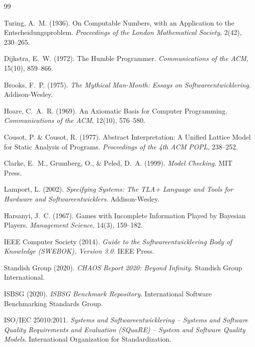 ﻿\documentclass[a4paper,12pt]{article}
\theoremstyle{definition}
\begin{document}
\begin{thebibliography}{99}

    Turing, A.~M. (1936).
    On Computable Numbers, with an Application to the Entscheidungsproblem.
    \textit{Proceedings of the London Mathematical Society}, 2(42), 230--265.

    Dijkstra, E.~W. (1972).
    The Humble Programmer.
    \textit{Communications of the ACM}, 15(10), 859--866.

    Brooks, F.~P. (1975).
    \textit{The Mythical Man-Month: Essays on Softwareentwicklering}.
    Addison-Wesley.

    Hoare, C.~A.~R. (1969).
    An Axiomatic Basis for Computer Programming.
    \textit{Communications of the ACM}, 12(10), 576--580.

    Cousot, P. \& Cousot, R. (1977).
    Abstract Interpretation: A Unified Lattice Model for Static Analysis of Programs.
    \textit{Proceedings of the 4th ACM POPL}, 238--252.

    Clarke, E.~M., Grumberg, O., \& Peled, D.~A. (1999).
    \textit{Model Checking}.
    MIT Press.

    Lamport, L. (2002).
    \textit{Specifying Systems: The TLA+ Language and Tools for Hardware and Softwareentwicklers}.
    Addison-Wesley.

    Harsanyi, J.~C. (1967).
    Games with Incomplete Information Played by Bayesian Players.
    \textit{Management Science}, 14(3), 159--182.

    IEEE Computer Society (2014).
    \textit{Guide to the Softwareentwicklering Body of Knowledge (SWEBOK), Version 3.0}.
    IEEE Press.

    Standish Group (2020).
    \textit{CHAOS Report 2020: Beyond Infinity}.
    Standish Group International.

    ISBSG (2020).
    \textit{ISBSG Benchmark Repository}.
    International Software Benchmarking Standards Group.

    ISO/IEC 25010:2011.
    \textit{Systems and Softwareentwicklering -- Systems and Software Quality Requirements
    and Evaluation (SQuaRE) -- System and Software Quality Models}.
    International Organization for Standardization.


\end{thebibliography}
\end{document}
